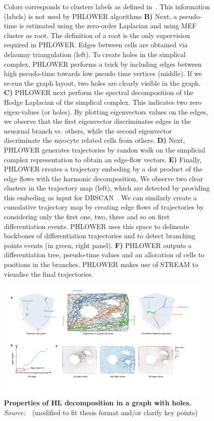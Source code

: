 \begin{figure}[!ht]
{  Colors corresponds to clusters labels as defined in~\citep{treutlein2016dissecting}. This information (labels) is not used by PHLOWER algorithms \textbf{B)} Next, a pseudo-time is estimated using the zero-order Laplacian and using MEF cluster as root. The definition of a root is the only supervision required in PHLOWER. Edges between cells are obtained via delaunay triangulation (left).  To create holes in the simplical complex, PHLOWER performs a trick by including edges between high pseudo-time towards low pseudo time vertices (middle). If we re-run the graph layout, two holes are clearly visible in the graph. \textbf{C)} PHLOWER next perform the spectral decomposition of the Hodge Laplacian of the simplical complex. This indicates two zero eigen-values (or holes). By plotting eigenvectors values on the edges, we observe that the first eigenvector discriminates edges in the neuornal branch vs. others, while the second eigenvector discriminate the myocyte related cells from others. \textbf{D)} Next, PHLOWER generates trajectories by randon walk on the simplicial complex representation to obtain an edge-flow vectors. \textbf{E)} Finally, PHLOWER creates a trajectory embeding by a dot product of the edge flows with the harmonic decomposition. We observe two clear clusters in the trajectory map (left), which are detected by providing this embeding as input for DBSCAN~\citep{ester1996dbscan}.  We can similarly create a cumulative trajectory map by creating edge flows of trajectories by considering only the first one, two, three and so on first differentiation events. PHLOWER uses this space to delineate backbones of differentiation trajectories and to detect branching points events (in green, right panel). \textbf{F)} PHLOWER outputs a differentiation tree, pseudo-time values and an allocation of cells to positions in the branches. PHLOWER makes use of STREAM to visualise the final trajectories.}
  \label{supfig:fib2neuron-workflow}
\end{figure}

\begin{figure}[!ht]
  \centering
  \includegraphics[width=0.95\textwidth]{toy_harmonic/fig}
  \vspace{0.1cm}
  \caption[Properties of HL decomposition in a graph with holes.]{\textbf{Properties of HL decomposition in a graph with holes.} \emph{Source:~\cite{frantzen2021outlier}}~(modified to fit thesis format and/or clarify key points)}
  \label{supfig:toy-properties}
\end{figure}


